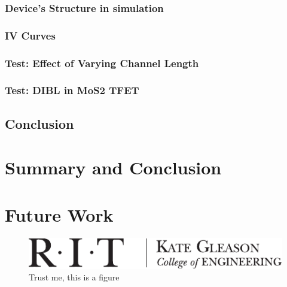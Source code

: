 \documentclass[microe]{ritthesis}
\begin{document}
\subsection{Device's Structure in simulation}
\subsection{IV Curves}
\subsection{Test: Effect of Varying Channel Length}
\subsection{Test: DIBL in MoS2 TFET}
\section{Conclusion}

\chapter{Summary and Conclusion}

\chapter{Future Work}







\begin{figure}
\centering
\includegraphics{kgcoelogohoriz}
\caption{Trust me, this is a figure}
\label{fig:samp}
\end{figure}
\end{document}
